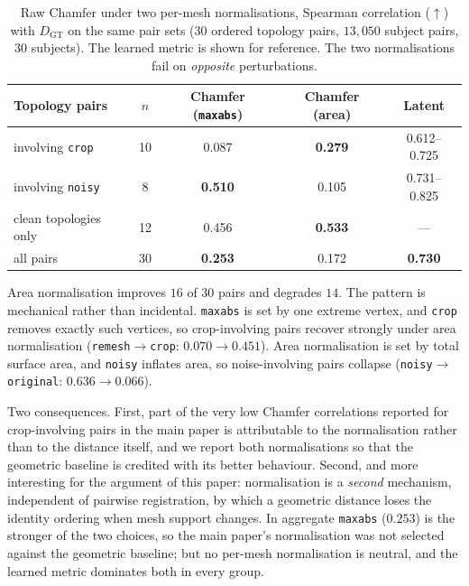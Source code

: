 \documentclass{article}
\begin{document}
\begin{table}[!ht]
\centering
\small
\caption{Raw Chamfer under two per-mesh normalisations, Spearman correlation
($\uparrow$) with $D_{\mathrm{GT}}$ on the same pair sets ($30$ ordered topology pairs,
$13{,}050$ subject pairs, $30$ subjects). The learned metric is shown for reference. The
two normalisations fail on \emph{opposite} perturbations.}
\label{tab:supp_normalisation}
\begin{tabular}{lcccc}
\toprule
Topology pairs & $n$ & Chamfer (\texttt{maxabs}) & Chamfer (area) & Latent \\
\midrule
involving \texttt{crop}   & 10 & 0.087 & \textbf{0.279} & 0.612--0.725 \\
involving \texttt{noisy}  &  8 & \textbf{0.510} & 0.105 & 0.731--0.825 \\
clean topologies only     & 12 & 0.456 & \textbf{0.533} & --- \\
\midrule
all pairs                 & 30 & \textbf{0.253} & 0.172 & \textbf{0.730} \\
\bottomrule
\end{tabular}
\end{table}

Area normalisation improves $16$ of $30$ pairs and degrades $14$. The pattern is
mechanical rather than incidental. \texttt{maxabs} is set by one extreme vertex, and
\texttt{crop} removes exactly such vertices, so crop-involving pairs recover strongly
under area normalisation (\texttt{remesh}$\rightarrow$\texttt{crop}: $0.070
\rightarrow 0.451$). Area normalisation is set by total surface area, and \texttt{noisy}
inflates area, so noise-involving pairs collapse
(\texttt{noisy}$\rightarrow$\texttt{original}: $0.636 \rightarrow 0.066$).

Two consequences. First, part of the very low Chamfer correlations reported for
crop-involving pairs in the main paper is attributable to the normalisation rather than
to the distance itself, and we report both normalisations so that the geometric baseline
is credited with its better behaviour. Second, and more interesting for the argument of
this paper: normalisation is a \emph{second} mechanism, independent of pairwise
registration, by which a geometric distance loses the identity ordering when mesh
support changes. In aggregate \texttt{maxabs} ($0.253$) is the stronger of the two
choices, so the main paper's normalisation was not selected against the geometric
baseline; but no per-mesh normalisation is neutral, and the learned metric dominates
both in every group.
\end{document}
